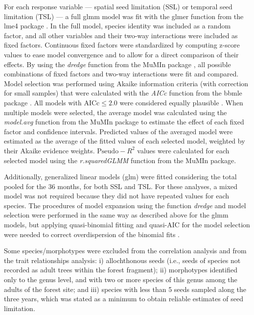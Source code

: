 \documentclass{article}
\begin{document}
For each response variable — spatial seed limitation (SSL) or temporal
seed limitation (TSL) — a full glmm model was fit with the glmer
function from the lme4 package \cite{lme4}. In the full model, species
identity was included as a random factor, and all other variables and
their two-way interactions were included as fixed factors. Continuous
fixed factors were standardized by computing z-score values to ease
model convergence \cite{Zuur2009book} and to allow for a direct
comparison of their effects. By using the \emph{dredge} function from
the MuMIn package \cite{MuMIn}, all possible combinations of fixed
factors and two-way interactions were fit and compared. Model
selection was performed using Akaike information criteria (with
correction for small samples) that were calculated with the
\emph{AICc} function from the bbmle package \cite{bbmle}. All models
with $\mathrm{AICc} \leq 2.0$ were considered equally plausible
\cite{Burnham2002}. When multiple models were selected, the average
model was calculated \cite{Burnham2002} using the \emph{model.avg}
function from the MuMIn package \cite{MuMIn} to estimate the effect of
each fixed factor and confidence intervals. Predicted values of the
averaged model were estimated as the average of the fitted values of
each selected model, weighted by their Akaike evidence
weights. $\mathrm{Pseudo-}R^2$ \cite{nakagawa2017} values were
calculated for each selected model using the \emph{r.squaredGLMM}
function from the MuMIn package.

Additionally, generalized linear models (glm) were fitted considering
the total pooled for the 36 months, for both SSL and TSL. For these
analyses, a mixed model was not required because they did not have
repeated values for each species. The procedures of model expansion
using the function \emph{dredge} and model selection were performed in
the same way as described above for the glmm models, but applying
quasi-binomial fitting and quasi-AIC for the model selection were
needed to correct overdispersion of the binomial fits
\cite{Zuur2009book}.

Some species/morphotypes were excluded from the correlation analysis
and from the trait relationships analysis: i) allochthonous seeds
(i.e., seeds of species not recorded as adult trees within the forest
fragment); ii) morphotypes identified only to the genus level, and
with two or more species of this genus among the adults of the forest
site; and iii) species with less than 5 seeds sampled along the three
years, which was stated as a minimum to obtain reliable estimates of
seed limitation.
\end{document}
